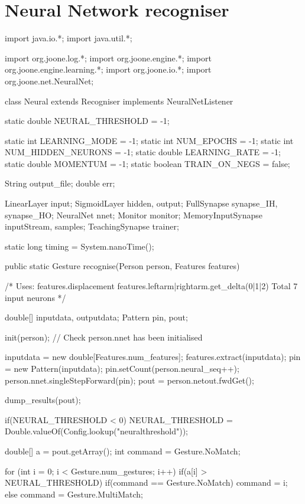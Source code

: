 \documentclass[12pt,a4,notitlepage]{report}
\renewcommand{\_}{\texttt{\symbol{95}}}
\newcommand{\<}{\texttt{\symbol{60}}}
\renewcommand{\>}{\texttt{\symbol{62}}}
\begin{document}


\appendix

\chapter{Neural Network recogniser}

\begin{code}
import java.io.*;
import java.util.*;

import org.joone.log.*;
import org.joone.engine.*;
import org.joone.engine.learning.*;
import org.joone.io.*;
import org.joone.net.NeuralNet;

class Neural extends Recogniser implements NeuralNetListener 
{
	static double NEURAL_THRESHOLD = -1;

	static int LEARNING_MODE = -1;
	static int NUM_EPOCHS = -1;
	static int NUM_HIDDEN_NEURONS = -1;
	static double LEARNING_RATE = -1;
	static double MOMENTUM = -1;
	static boolean TRAIN_ON_NEGS = false;
	
	String output_file;
	double err;
	
	LinearLayer input;
	SigmoidLayer hidden, output;
	FullSynapse synapse_IH, synapse_HO;
	NeuralNet nnet;
	Monitor monitor;
	MemoryInputSynapse inputStream, samples;
	TeachingSynapse trainer;
	
	static long timing = System.nanoTime();

	public static Gesture recognise(Person person, Features features)
	{		
		/* Uses:
			features.displacement
			features.leftarm|rightarm.get_delta(0|1|2)
			Total 7 input neurons
		*/
		
		double[] inputdata, outputdata;
		Pattern pin, pout;
		
		init(person); // Check person.nnet has been initialised

		inputdata = new double[Features.num_features];
		features.extract(inputdata);
		pin = new Pattern(inputdata);
		pin.setCount(person.neural_seq++);
		person.nnet.singleStepForward(pin);
		pout = person.netout.fwdGet();
		
		dump_results(pout);
				
		if(NEURAL_THRESHOLD < 0)
			NEURAL_THRESHOLD = Double.valueOf(Config.lookup("neuralthreshold"));
		
		
		double[] a = pout.getArray();
		int command = Gesture.NoMatch;
				
		for (int i = 0; i < Gesture.num_gestures; i++)
		{
			if(a[i] > NEURAL_THRESHOLD)
			{
				if(command == Gesture.NoMatch)
					command = i;
				else
					command = Gesture.MultiMatch;
			}
		}
		
}}
\end{code}
\end{document}
